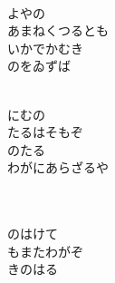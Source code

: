 \documentclass[10pt,b5j]{tarticle} %
\begin{document}
\begin{enumerate}
\begin{minipage}[c]{\blocksize}
    \end{minipage}
    \begin{minipage}[c]{\blocksize}
        
        \vspace{\linespace}
        \item~\\
        よやの\\
        あまねくつるとも\\
        いかでかむき\\
        のをゐずば
        
    \end{minipage}
    \begin{minipage}[c]{\blocksize}
        
        \vspace{\linespace}
        \item~\\
        にむの\\
        たるはそもぞ\\
        のたる\\
        わがにあらざるや
        
    \end{minipage}
    \begin{minipage}[c]{\blocksize}
        
        \vspace{\linespace}
        \item~\\
        \\
        のはけて\\
        もまたわがぞ\\
        きのはる
        
    \end{minipage}
    \begin{minipage}[c]{\blocksize}
        

\end{minipage}
\end{enumerate}
\end{document}
